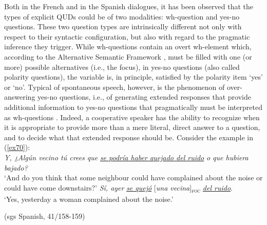Both in the French and in the Spanish dialogues, it has been observed that the types of explicit QUDs could be of two modalities: wh-question and yes-no questions. These two question types are intrinsically different not only with respect to their syntactic configuration, but also with regard to the pragmatic inference they trigger. While wh-questions contain an overt wh-element which, according to the Alternative Semantic Framework \parencite{rooth1985association, rooth1992theory}, must be filled with one (or more) possible alternatives (i.e., the focus), in yes-no questions (also called polarity questions), the variable is, in principle, satisfied by the polarity item `yes' or `no'. 
Typical of spontaneous speech, however, is the phenomenon of over-answering yes-no questions, i.e., of generating extended responses that provide additional information to yes-no questions that pragmatically must be interpreted as wh-questions \parencite{wahlster1983over, steensig2013yes}. Indeed, a cooperative speaker has the ability to recognize when it is appropriate to provide more than a mere literal, direct answer to a question, and to decide what that extended response should be.
Consider the example in (\ref{ex70}): \\

\ea \label{ex70}
\ea \textit{Y, ¿Algún vecino tú crees que} \uline{\textit{se podría haber quejado del ruido}} \textit{o que hubiera bajado?}\\
 ‘And do you think that some neighbour could have complained about the noise or could have come downstairs?'
\ex \textit{Sí, ayer} \uline{\textit{se quejó}} {[\textit{una vecina}]\textsubscript{\textsc{foc}}} \normalsize \uline{\textit{del ruido}}.\\
‘Yes, yesterday a woman complained about the noise.'

\hfill (sgs Spanish, 41/158-159)    
\z \z


